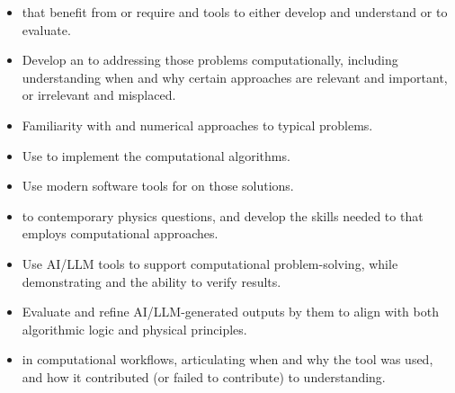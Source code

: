 \documentclass[12pt]{article}
\begin{document}
  \begin{itemize}
    \item {} that benefit from or require  and tools to either develop and understand or to evaluate. 
    \item Develop an  to addressing those problems computationally, including understanding when and why certain approaches are relevant and important, or irrelevant and misplaced.
    \item Familiarity with  and numerical approaches to typical problems.
    \item Use  to implement the computational algorithms. 
    \item Use modern software tools for  on those solutions.
    \item {} to contemporary physics questions, and develop the skills needed to  that employs computational approaches.
    \item Use AI/LLM tools  to support computational problem-solving, while demonstrating  and the ability to verify results.
    \item Evaluate and refine AI/LLM-generated outputs by  them to align with both algorithmic logic and physical principles.
    \item {} in computational workflows, articulating when and why the tool was used, and how it contributed (or failed to contribute) to understanding.
  \end{itemize}
\end{document}
